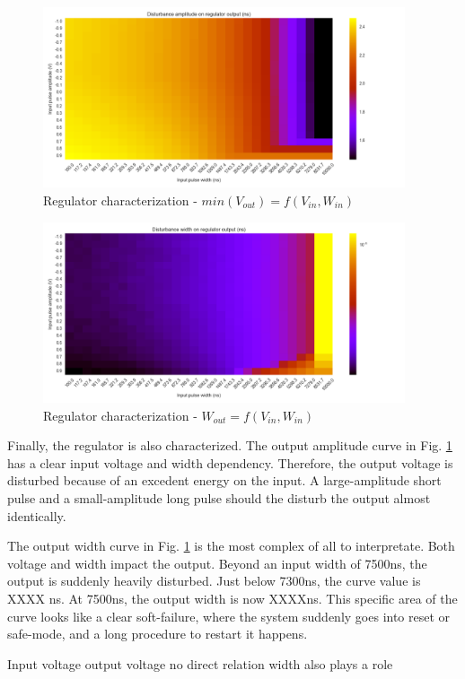 \begin{figure}[!htb]
  \centering
  \includegraphics[width=0.95\textwidth]{src/4/figures/regulator_cz_V2_amplitude.png}
  \caption{Regulator characterization - $min(V_{out}) = f(V_{in}, W_{in})$}
  \label{fig:reg-cz-v2-amp}
\end{figure}

\begin{figure}[!htb]
  \centering
  \includegraphics[width=0.95\textwidth]{src/4/figures/regulator_cz_V2_width.png}
  \caption{Regulator characterization - $W_{out} = f(V_{in}, W_{in})$}
  \label{fig:reg-cz-v2-width}
\end{figure}

Finally, the regulator is also characterized.
The output amplitude curve in Fig. \ref{fig:reg-cz-v2-amp} has a clear input voltage and width dependency.
Therefore, the output voltage is disturbed because of an excedent energy on the input.
A large-amplitude short pulse and a small-amplitude long pulse should the disturb the output almost identically.

The output width curve in Fig. \ref{fig:reg-cz-v2-amp} is the most complex of all to interpretate.
Both voltage and width impact the output.
Beyond an input width of 7500ns, the output is suddenly heavily disturbed.
Just below 7300ns, the curve value is XXXX ns.
At 7500ns, the output width is now XXXXns.
This specific area of the curve looks like a clear soft-failure, where the system suddenly goes into reset or safe-mode, and a long procedure to restart it happens.

Input voltage output voltage no direct relation
width also plays a role

